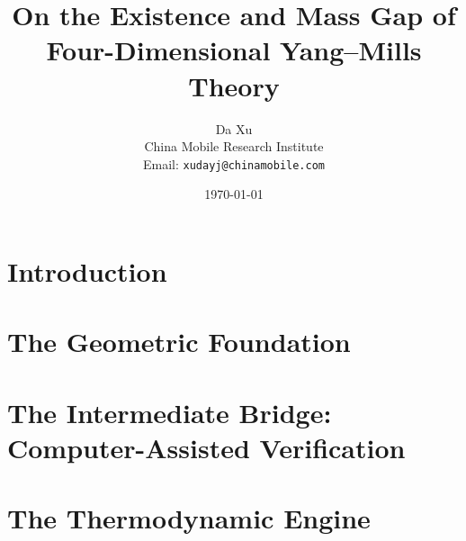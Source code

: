 \documentclass[11pt,a4paper]{report}
\title{\textbf{On the Existence and Mass Gap of Four-Dimensional Yang--Mills Theory}}
\author{Da Xu \\ China Mobile Research Institute \\ Email: \texttt{xudayj@chinamobile.com}}
\date{\today}
\begin{document}
\maketitle



\tableofcontents

\chapter{Introduction}


\chapter{The Geometric Foundation}








\chapter{The Intermediate Bridge: Computer-Assisted Verification}

% 
% 
%
%
%
%
%
%

\chapter{The Thermodynamic Engine}
\label{ch:thermodynamics}







% 
\end{document}
